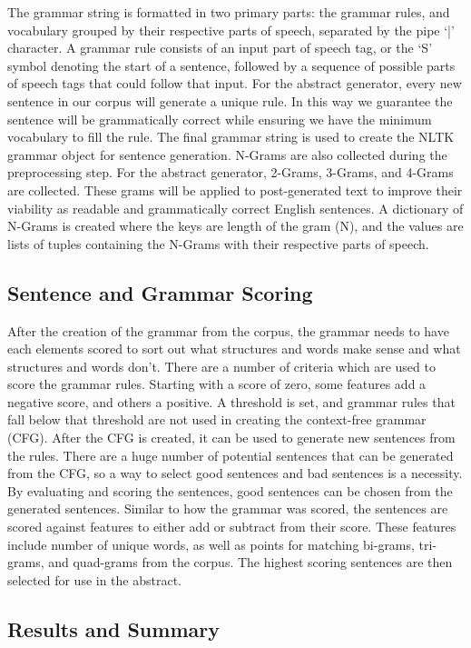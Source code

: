 \documentclass[letterpaper, 10 pt, conference]{ieeeconf}  %
\begin{document}
The grammar string is formatted in two primary parts: the grammar rules, and vocabulary grouped by their respective parts of speech, separated by the pipe ‘|’ character. A grammar rule consists of an input part of speech tag, or the ‘S’ symbol denoting the start of a sentence, followed by a sequence of possible parts of speech tags that could follow that input. For the abstract generator, every new sentence in our corpus will generate a unique rule. In this way we guarantee the sentence will be grammatically correct while ensuring we have the minimum vocabulary to fill the rule. The final grammar string is used to create the NLTK grammar object for sentence generation.
N-Grams are also collected during the preprocessing step. For the abstract generator, 2-Grams, 3-Grams, and 4-Grams are collected. These grams will be applied to post-generated text to improve their viability as readable and grammatically correct English sentences. A dictionary of N-Grams is created where the keys are  length of the gram (N), and the values are lists of tuples containing the N-Grams with their respective parts of speech.

\subsection{Sentence and Grammar Scoring}

After the creation of the grammar from the corpus, the grammar needs to have each elements scored to sort out what structures and words make sense and what structures and words don’t. There are a number of criteria which are used to score the grammar rules. Starting with a score of zero, some features add a negative score, and others a positive. A threshold is set, and grammar rules that fall below that threshold are not used in creating the context-free grammar (CFG).
After the CFG is created, it can be used to generate new sentences from the rules. There are a huge number of potential sentences that can be generated from the CFG, so a way to select good sentences and bad sentences is a necessity. By evaluating and scoring the sentences, good sentences can be chosen from the generated sentences. Similar to how the grammar was scored, the sentences are scored against features to either add or subtract from their score. These features include number of unique words, as well as points for matching bi-grams, tri-grams, and quad-grams from the corpus. The highest scoring sentences are then selected for use in the abstract.

\subsection{Results and Summary}
\end{document}
